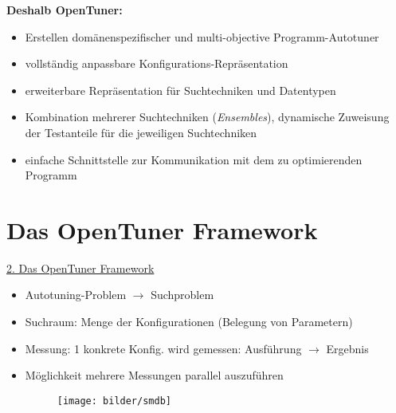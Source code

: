 
    \begin{frame}
    
    \textbf{Deshalb OpenTuner:}   
    \begin{itemize}
      \item Erstellen domänenspezifischer und multi-objective Programm-Autotuner
      \item vollständig anpassbare Konfigurations-Repräsentation
      \item erweiterbare Repräsentation für Suchtechniken und Datentypen
      \item Kombination mehrerer Suchtechniken (\textit{Ensembles}), dynamische Zuweisung der
      Testanteile für die jeweiligen Suchtechniken
      \item einfache Schnittstelle zur Kommunikation mit dem zu optimierenden Programm           
    \end{itemize}
    \end{frame}

    
  
    
  \section{Das OpenTuner Framework}   
   
  
  \begin{frame}
  
  \underline{2. Das OpenTuner Framework}
  \begin{itemize}
    \item Autotuning-Problem $\rightarrow$ Suchproblem
    \item Suchraum: Menge der Konfigurationen (Belegung von Parametern)
    \item Messung: 1 konkrete Konfig. wird gemessen: Ausführung $\rightarrow$ Ergebnis
    \item Möglichkeit mehrere Messungen parallel auszuführen
    
    \begin{figure}[ht]
      \centering	      
      \texttt{[image: bilder/smdb]}
      \label{smdb}
    \end{figure}

  \end{itemize}
  \end{frame}
    

